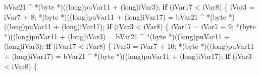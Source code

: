 \documentclass[
]{article}
\newenvironment{Shaded}{}{}
\newcommand{\ControlFlowTok}[1]{\textcolor[rgb]{0.00,0.44,0.13}{\textbf{#1}}}
\newcommand{\DataTypeTok}[1]{\textcolor[rgb]{0.56,0.13,0.00}{#1}}
\newcommand{\DecValTok}[1]{\textcolor[rgb]{0.25,0.63,0.44}{#1}}
\newcommand{\NormalTok}[1]{#1}
\newcommand{\OperatorTok}[1]{\textcolor[rgb]{0.40,0.40,0.40}{#1}}
\begin{document}
\begin{Shaded}
\begin{Highlighting}[]
\NormalTok{                     bVar21 }\OperatorTok{\^{}} \OperatorTok{*(}\NormalTok{byte }\OperatorTok{*)((}\DataTypeTok{long}\OperatorTok{)}\NormalTok{puVar11 }\OperatorTok{+} \OperatorTok{(}\DataTypeTok{long}\OperatorTok{)}\NormalTok{iVar3}\OperatorTok{);}
                \ControlFlowTok{if} \OperatorTok{(}\NormalTok{iVar17 }\OperatorTok{\textless{}}\NormalTok{ iVar8}\OperatorTok{)} \OperatorTok{\{}
\NormalTok{                  iVar3 }\OperatorTok{=}\NormalTok{ iVar7 }\OperatorTok{+} \DecValTok{8}\OperatorTok{;}
                  \OperatorTok{*(}\NormalTok{byte }\OperatorTok{*)((}\DataTypeTok{long}\OperatorTok{)}\NormalTok{puVar11 }\OperatorTok{+} \OperatorTok{(}\DataTypeTok{long}\OperatorTok{)}\NormalTok{iVar17}\OperatorTok{)} \OperatorTok{=}
\NormalTok{                       bVar21 }\OperatorTok{\^{}} \OperatorTok{*(}\NormalTok{byte }\OperatorTok{*)((}\DataTypeTok{long}\OperatorTok{)}\NormalTok{puVar11 }\OperatorTok{+} \OperatorTok{(}\DataTypeTok{long}\OperatorTok{)}\NormalTok{iVar17}\OperatorTok{);}
                  \ControlFlowTok{if} \OperatorTok{(}\NormalTok{iVar3 }\OperatorTok{\textless{}}\NormalTok{ iVar8}\OperatorTok{)} \OperatorTok{\{}
\NormalTok{                    iVar17 }\OperatorTok{=}\NormalTok{ iVar7 }\OperatorTok{+} \DecValTok{9}\OperatorTok{;}
                    \OperatorTok{*(}\NormalTok{byte }\OperatorTok{*)((}\DataTypeTok{long}\OperatorTok{)}\NormalTok{puVar11 }\OperatorTok{+} \OperatorTok{(}\DataTypeTok{long}\OperatorTok{)}\NormalTok{iVar3}\OperatorTok{)} \OperatorTok{=}
\NormalTok{                         bVar21 }\OperatorTok{\^{}} \OperatorTok{*(}\NormalTok{byte }\OperatorTok{*)((}\DataTypeTok{long}\OperatorTok{)}\NormalTok{puVar11 }\OperatorTok{+} \OperatorTok{(}\DataTypeTok{long}\OperatorTok{)}\NormalTok{iVar3}\OperatorTok{);}
                    \ControlFlowTok{if} \OperatorTok{(}\NormalTok{iVar17 }\OperatorTok{\textless{}}\NormalTok{ iVar8}\OperatorTok{)} \OperatorTok{\{}
\NormalTok{                      iVar3 }\OperatorTok{=}\NormalTok{ iVar7 }\OperatorTok{+} \DecValTok{10}\OperatorTok{;}
                      \OperatorTok{*(}\NormalTok{byte }\OperatorTok{*)((}\DataTypeTok{long}\OperatorTok{)}\NormalTok{puVar11 }\OperatorTok{+} \OperatorTok{(}\DataTypeTok{long}\OperatorTok{)}\NormalTok{iVar17}\OperatorTok{)} \OperatorTok{=}
\NormalTok{                           bVar21 }\OperatorTok{\^{}} \OperatorTok{*(}\NormalTok{byte }\OperatorTok{*)((}\DataTypeTok{long}\OperatorTok{)}\NormalTok{puVar11 }\OperatorTok{+} \OperatorTok{(}\DataTypeTok{long}\OperatorTok{)}\NormalTok{iVar17}\OperatorTok{);}
                      \ControlFlowTok{if} \OperatorTok{(}\NormalTok{iVar3 }\OperatorTok{\textless{}}\NormalTok{ iVar8}\OperatorTok{)} \OperatorTok{\{}

\end{Highlighting}
\end{Shaded}
\end{document}

